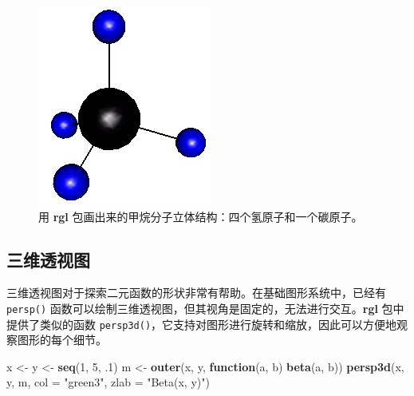 \documentclass[
  b5paper,
  UTF8,twoside]{book}
\newenvironment{Shaded}{\begin{snugshade}}{\end{snugshade}}
\newcommand{\AttributeTok}[1]{\textcolor[rgb]{0.13,0.29,0.53}{#1}}
\newcommand{\ControlFlowTok}[1]{\textcolor[rgb]{0.13,0.29,0.53}{\textbf{#1}}}
\newcommand{\DecValTok}[1]{\textcolor[rgb]{0.00,0.00,0.81}{#1}}
\newcommand{\FunctionTok}[1]{\textcolor[rgb]{0.13,0.29,0.53}{\textbf{#1}}}
\newcommand{\NormalTok}[1]{#1}
\newcommand{\OtherTok}[1]{\textcolor[rgb]{0.56,0.35,0.01}{#1}}
\newcommand{\StringTok}[1]{\textcolor[rgb]{0.31,0.60,0.02}{#1}}
\begin{document}
\begin{figure}

{\centering \includegraphics{images/rgl-ch4} 

}

\caption[用 \textbf{rgl} 包画出来的甲烷分子立体结构]{用 \textbf{rgl} 包画出来的甲烷分子立体结构：四个氢原子和一个碳原子。}\label{fig:rgl-ch4}
\end{figure}





\subsection{三维透视图}\label{ux4e09ux7ef4ux900fux89c6ux56fe}

三维透视图对于探索二元函数的形状非常有帮助。在基础图形系统中，已经有 \texttt{persp()} 函数可以绘制三维透视图，但其视角是固定的，无法进行交互。\textbf{rgl} 包中提供了类似的函数 \texttt{persp3d()}，它支持对图形进行旋转和缩放，因此可以方便地观察图形的每个细节。

\begin{Shaded}
\begin{Highlighting}[]
\NormalTok{x }\OtherTok{\textless{}{-}}\NormalTok{ y }\OtherTok{\textless{}{-}} \FunctionTok{seq}\NormalTok{(}\DecValTok{1}\NormalTok{, }\DecValTok{5}\NormalTok{, .}\DecValTok{1}\NormalTok{)}
\NormalTok{m }\OtherTok{\textless{}{-}} \FunctionTok{outer}\NormalTok{(x, y, }\ControlFlowTok{function}\NormalTok{(a, b) }\FunctionTok{beta}\NormalTok{(a, b))}
\FunctionTok{persp3d}\NormalTok{(x, y, m, }\AttributeTok{col =} \StringTok{"green3"}\NormalTok{, }\AttributeTok{zlab =} \StringTok{"Beta(x, y)"}\NormalTok{)}
\end{Highlighting}
\end{Shaded}
\end{document}
